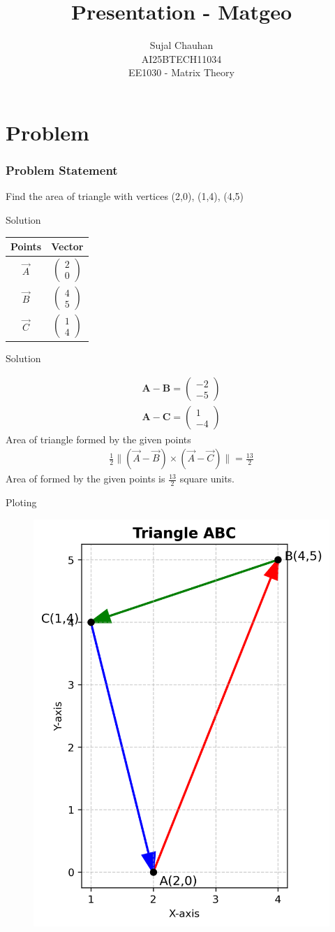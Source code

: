 \documentclass{beamer}
\title{Presentation - Matgeo}
\author{ Sujal Chauhan\\
AI25BTECH11034 \\
EE1030 - Matrix Theory}
\theoremstyle{remark}
\providecommand{\norm}[1]{\lVert#1\rVert}
\newcommand{\myvec}[1]{\ensuremath{\begin{pmatrix}#1\end{pmatrix}}}
\let\vec\mathbf
\numberwithin{equation}{section}
\begin{document}
\begin{frame}
\titlepage
\end{frame}

\section{Problem}
\begin{frame}
\frametitle{Problem Statement}
Find the area of triangle with vertices (2,0), (1,4), (4,5) 
\end{frame}

\begin{frame}{Solution}
    
\begin{center}
\begin{tabular}{|c|c|}
\hline
Points & Vector \\ \hline
$\Vec{A}$ & $\myvec{2 \\ 0}$\\ \hline
$\Vec{B}$ & $\myvec{4 \\ 5}$\\ \hline
$\Vec{C}$ & $\myvec{1\\ 4}$\\ \hline

\end{tabular}
\end{center}
\end{frame}
\begin{frame}{Solution}
    

\begin{align}
    \vec{A}-\vec{B}=\myvec{-2 \\ -5}
\end{align}
\begin{align}
    \vec{A}-\vec{C}=\myvec{1\\-4}
\end{align}
Area of triangle formed by the given points
\begin{align}
    \frac{1}{2}\norm{(\Vec{A}-\Vec{B})\times(\Vec{A}-\Vec{C})}=\frac{13}{2}
\end{align}
Area of formed by the given points is $\frac{13}{2}$
 square units.
 \end{frame}
\begin{frame}{Ploting}
\begin{figure}[h]
    \centering
    \includegraphics[width=0.4\linewidth]{figures/triangle.png}
    \caption{}
    \label{fig:placeholder}
\end{figure}

\end{frame}
\end{document}
